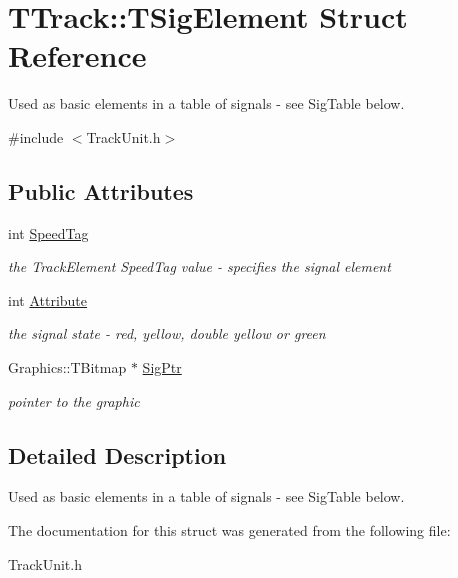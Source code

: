 \hypertarget{struct_t_track_1_1_t_sig_element}{}\section{T\+Track\+:\+:T\+Sig\+Element Struct Reference}
\label{struct_t_track_1_1_t_sig_element}


Used as basic elements in a table of signals -\/ see Sig\+Table below.  




{\ttfamily \#include $<$Track\+Unit.\+h$>$}

\subsection*{Public Attributes}
\begin{DoxyCompactItemize}
\item 
\mbox{\label{struct_t_track_1_1_t_sig_element_a34471e55de8fcc915046b28706156071}} 
int \mbox{\hyperlink{struct_t_track_1_1_t_sig_element_a34471e55de8fcc915046b28706156071}{Speed\+Tag}}
\begin{DoxyCompactList}\small\item\em the Track\+Element Speed\+Tag value -\/ specifies the signal element \end{DoxyCompactList}\item 
\mbox{\label{struct_t_track_1_1_t_sig_element_aaf0195d7519c41c5f2acc57c07b6fb83}} 
int \mbox{\hyperlink{struct_t_track_1_1_t_sig_element_aaf0195d7519c41c5f2acc57c07b6fb83}{Attribute}}
\begin{DoxyCompactList}\small\item\em the signal state -\/ red, yellow, double yellow or green \end{DoxyCompactList}\item 
\mbox{\label{struct_t_track_1_1_t_sig_element_a8e0002e65092d0c2f40adc3980de42c3}} 
Graphics\+::\+T\+Bitmap $\ast$ \mbox{\hyperlink{struct_t_track_1_1_t_sig_element_a8e0002e65092d0c2f40adc3980de42c3}{Sig\+Ptr}}
\begin{DoxyCompactList}\small\item\em pointer to the graphic \end{DoxyCompactList}\end{DoxyCompactItemize}


\subsection{Detailed Description}
Used as basic elements in a table of signals -\/ see Sig\+Table below. 

The documentation for this struct was generated from the following file\+:\begin{DoxyCompactItemize}
\item 
Track\+Unit.\+h\end{DoxyCompactItemize}
